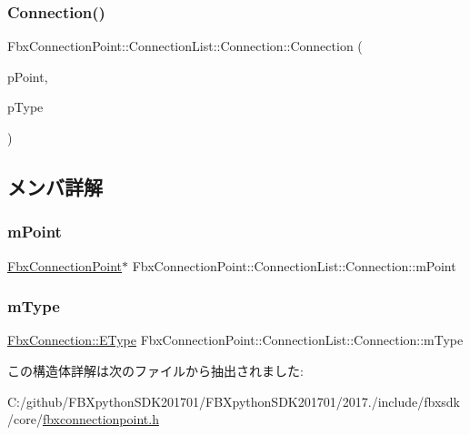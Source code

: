 \subsubsection{\texorpdfstring{Connection()}{Connection()}}
{\footnotesize\ttfamily Fbx\+Connection\+Point\+::\+Connection\+List\+::\+Connection\+::\+Connection (\begin{DoxyParamCaption}\item[{\hyperlink{class_fbx_connection_point}{Fbx\+Connection\+Point} $\ast$}]{p\+Point,  }\item[{\hyperlink{class_fbx_connection_a3df448a5db356652ab99fd2be2553749}{Fbx\+Connection\+::\+E\+Type}}]{p\+Type }\end{DoxyParamCaption})}



\subsection{メンバ詳解}
\mbox{\label{struct_fbx_connection_point_1_1_connection_list_1_1_connection_afcd68ab69315b9c919b4a2104d28eeaa}} 
\subsubsection{\texorpdfstring{m\+Point}{mPoint}}
{\footnotesize\ttfamily \hyperlink{class_fbx_connection_point}{Fbx\+Connection\+Point}$\ast$ Fbx\+Connection\+Point\+::\+Connection\+List\+::\+Connection\+::m\+Point}

\mbox{\label{struct_fbx_connection_point_1_1_connection_list_1_1_connection_ad3018de581c15cd5cf4e85c2a87b9d6b}} 
\subsubsection{\texorpdfstring{m\+Type}{mType}}
{\footnotesize\ttfamily \hyperlink{class_fbx_connection_a3df448a5db356652ab99fd2be2553749}{Fbx\+Connection\+::\+E\+Type} Fbx\+Connection\+Point\+::\+Connection\+List\+::\+Connection\+::m\+Type}



この構造体詳解は次のファイルから抽出されました\+:\begin{DoxyCompactItemize}
\item 
C\+:/github/\+F\+B\+Xpython\+S\+D\+K201701/\+F\+B\+Xpython\+S\+D\+K201701/2017./include/fbxsdk/core/\hyperlink{fbxconnectionpoint_8h}{fbxconnectionpoint.\+h}\end{DoxyCompactItemize}
